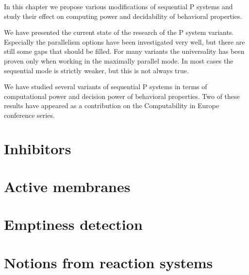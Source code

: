 In this chapter we propose various modifications of sequential P systems and study their effect on computing power and decidability of behavioral properties.

We have presented the current state of the research of the P system variants. Especially the parallelism options have been investigated very well, but there are still some gaps that should be filled. For many variants the universality has been proven only when working in the maximally parallel mode. In most cases the sequential mode is strictly weaker, but this is not always true.

We have studied several variants of sequential P systems in terms of computational power and decision power of behavioral properties. Two of these results have appeared as a contribution on the Computability in Europe conference series.

\section{Inhibitors} %
\label{sec:inhibitors}


\section{Active membranes} %
\label{sec:active_membranes}


\section{Emptiness detection} %
\label{sec:emptiness_detection}


\section{Notions from reaction systems} %
\label{sec:notions_from_reaction_systems}

